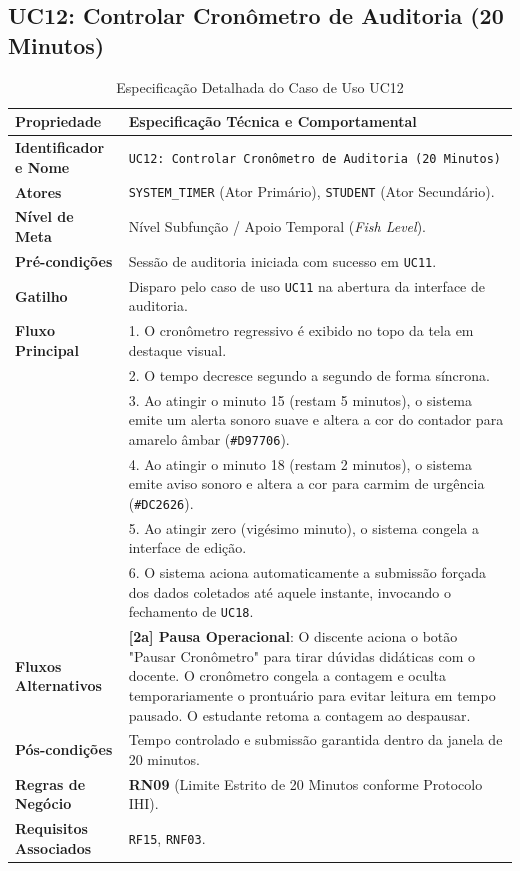 \subsection{UC12: Controlar Cronômetro de Auditoria (20 Minutos)}
\label{uc12_especificacao}

\begin{table}[!ht]
\centering
\caption{Especificação Detalhada do Caso de Uso UC12}
\label{tab_uc12}
\footnotesize
\begin{tabularx}{\textwidth}{p{3.5cm} X}
\toprule
\textbf{Propriedade} & \textbf{Especificação Técnica e Comportamental} \\
\midrule
\textbf{Identificador e Nome} & \texttt{UC12: Controlar Cronômetro de Auditoria (20 Minutos)} \\
\textbf{Atores} & \texttt{SYSTEM\_TIMER} (Ator Primário), \texttt{STUDENT} (Ator Secundário). \\
\textbf{Nível de Meta} & Nível Subfunção / Apoio Temporal (\textit{Fish Level}). \\
\textbf{Pré-condições} & Sessão de auditoria iniciada com sucesso em \texttt{UC11}. \\
\textbf{Gatilho} & Disparo pelo caso de uso \texttt{UC11} na abertura da interface de auditoria. \\
\textbf{Fluxo Principal} & 
1. O cronômetro regressivo é exibido no topo da tela em destaque visual.\\
& 2. O tempo decresce segundo a segundo de forma síncrona.\\
& 3. Ao atingir o minuto 15 (restam 5 minutos), o sistema emite um alerta sonoro suave e altera a cor do contador para amarelo âmbar (\texttt{\#D97706}).\\
& 4. Ao atingir o minuto 18 (restam 2 minutos), o sistema emite aviso sonoro e altera a cor para carmim de urgência (\texttt{\#DC2626}).\\
& 5. Ao atingir zero (vigésimo minuto), o sistema congela a interface de edição.\\
& 6. O sistema aciona automaticamente a submissão forçada dos dados coletados até aquele instante, invocando o fechamento de \texttt{UC18}. \\
\textbf{Fluxos Alternativos} & 
\textbf{[2a] Pausa Operacional}: O discente aciona o botão "Pausar Cronômetro" para tirar dúvidas didáticas com o docente. O cronômetro congela a contagem e oculta temporariamente o prontuário para evitar leitura em tempo pausado. O estudante retoma a contagem ao despausar. \\
\textbf{Pós-condições} & Tempo controlado e submissão garantida dentro da janela de 20 minutos. \\
\textbf{Regras de Negócio} & \textbf{RN09} (Limite Estrito de 20 Minutos conforme Protocolo IHI). \\
\textbf{Requisitos Associados} & \texttt{RF15}, \texttt{RNF03}. \\
\bottomrule
\end{tabularx}
\end{table}

